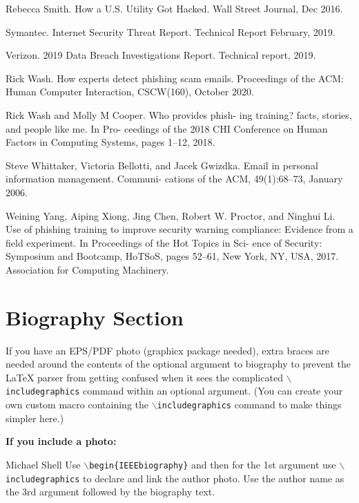 \documentclass[lettersize,journal]{IEEEtran}
\begin{document}
\begin{thebibliography}{1}
  Rebecca Smith. How a U.S. Utility Got Hacked. Wall Street Journal, Dec 2016.

  Symantec. Internet Security Threat Report. Technical Report February, 2019.

  Verizon. 2019 Data Breach Investigations Report. Technical report, 2019.

  Rick Wash. How experts detect phishing scam emails. Proceedings of the ACM: Human Computer Interaction, CSCW(160), October 2020.

  Rick Wash and Molly M Cooper. Who provides phish-
  ing training? facts, stories, and people like me. In Pro-
  ceedings of the 2018 CHI Conference on Human Factors
  in Computing Systems, pages 1–12, 2018.

  Steve Whittaker, Victoria Bellotti, and Jacek Gwizdka.
  Email in personal information management. Communi-
  cations of the ACM, 49(1):68–73, January 2006.

  Weining Yang, Aiping Xiong, Jing Chen, Robert W.
  Proctor, and Ninghui Li. Use of phishing training to
  improve security warning compliance: Evidence from a
  field experiment. In Proceedings of the Hot Topics in Sci-
  ence of Security: Symposium and Bootcamp, HoTSoS,
  pages 52–61, New York, NY, USA, 2017. Association
  for Computing Machinery.

\end{thebibliography}

\newpage

\section{Biography Section}
If you have an EPS/PDF photo (graphicx package needed), extra braces are needed
around the contents of the optional argument to biography to prevent the LaTeX
parser from getting confused when it sees the complicated
$\backslash${\tt{includegraphics}} command within an optional argument. (You
can create your own custom macro containing the
$\backslash${\tt{includegraphics}} command to make things simpler here.)

\vspace{11pt}

\bf{If you include a photo:}\vspace{-33pt}
\begin{IEEEbiography}{Michael Shell}
  Use $\backslash${\tt{begin\{IEEEbiography\}}} and then for the 1st argument use $\backslash${\tt{includegraphics}} to declare and link the author photo.
  Use the author name as the 3rd argument followed by the biography text.
\end{IEEEbiography}
\end{document}
